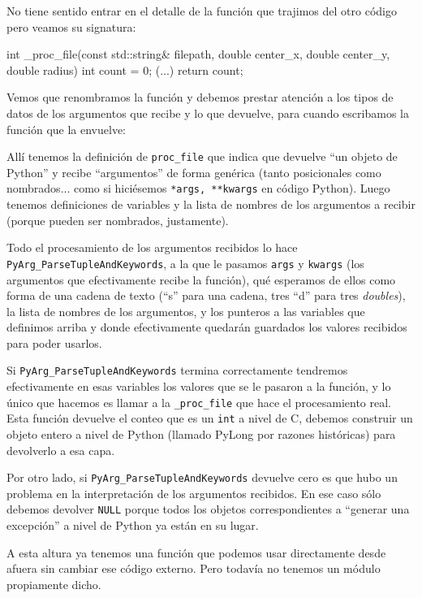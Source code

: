 No tiene sentido entrar en el detalle de la función que trajimos del otro código pero veamos su signatura:

\begin{cpp}
int _proc_file(const std::string& filepath, double center_x, double center_y, double radius) {
    int count = 0;
    (...)
    return count;
}
\end{cpp}

Vemos que renombramos la función y debemos prestar atención a los tipos de datos de los argumentos que recibe y lo que devuelve, para cuando escribamos la función que la envuelve:


Allí tenemos la definición de \texttt{proc\_file} que indica que devuelve ``un objeto de Python'' y recibe ``argumentos'' de forma genérica (tanto posicionales como nombrados... como si hiciésemos \texttt{*args, **kwargs} en código Python). Luego tenemos definiciones de variables y la lista de nombres de los argumentos a recibir (porque pueden ser nombrados, justamente).

Todo el procesamiento de los argumentos recibidos lo hace \texttt{PyArg\_ParseTupleAndKeywords}, a la que le pasamos \texttt{args} y \texttt{kwargs} (los argumentos que efectivamente recibe la función), qué esperamos de ellos como forma de una cadena de texto (``s'' para una cadena, tres ``d'' para tres \textit{doubles}), la lista de nombres de los argumentos, y los punteros a las variables que definimos arriba y donde efectivamente quedarán guardados los valores recibidos para poder usarlos.

Si \texttt{PyArg\_ParseTupleAndKeywords} termina correctamente tendremos efectivamente en esas variables los valores que se le pasaron a la función, y lo único que hacemos es llamar a la \texttt{\_proc\_file} que hace el procesamiento real. Esta función devuelve el conteo que es un \texttt{int} a nivel de C, debemos construir un objeto entero a nivel de Python (llamado PyLong por razones históricas) para devolverlo a esa capa.

Por otro lado, si \texttt{PyArg\_ParseTupleAndKeywords} devuelve cero es que hubo un problema en la interpretación de los argumentos recibidos. En ese caso sólo debemos devolver \texttt{NULL} porque todos los objetos correspondientes a ``generar una excepción'' a nivel de Python ya están en su lugar. 

A esta altura ya tenemos una función que podemos usar directamente desde afuera sin cambiar ese código externo. Pero todavía no tenemos un módulo propiamente dicho.


